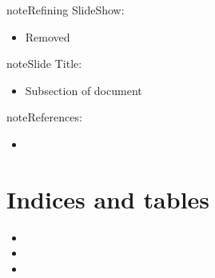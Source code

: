 \documentclass[letterpaper,12pt,english,openany,oneside]{sphinxmanual}
\begin{document}
\begin{sphinxadmonition}{note}{\label{\detokenize{slides/index:id2}}Refining SlideShow:}\begin{itemize}
\item {} 
\sphinxAtStartPar
Removed 

\end{itemize}
\end{sphinxadmonition}

\begin{sphinxadmonition}{note}{\label{\detokenize{slides/index:id3}}Slide Title:}\begin{itemize}
\item {} 
\sphinxAtStartPar
Subsection of document

\end{itemize}
\end{sphinxadmonition}

\begin{sphinxadmonition}{note}{\label{\detokenize{slides/index:id4}}References:}\begin{itemize}
\item {} 
\sphinxAtStartPar
{}

\end{itemize}
\end{sphinxadmonition}


\chapter{Indices and tables}
\label{\detokenize{index:indices-and-tables}}\begin{itemize}
\item {} 
\sphinxAtStartPar
{}

\item {} 
\sphinxAtStartPar
{}

\item {} 
\sphinxAtStartPar
{}

\end{itemize}

\appendix
{}\label{\detokenize{glossary::doc}}
\end{document}
